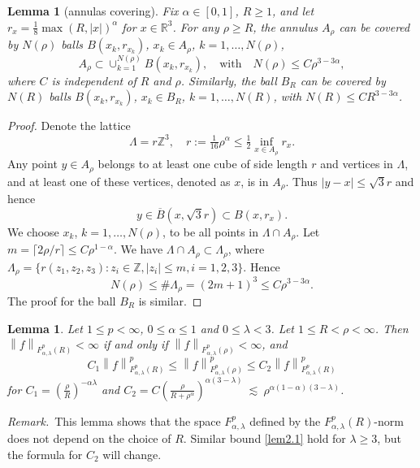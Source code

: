 \documentclass[11pt]{article}
\numberwithin{equation}{section}
\newtheorem{lem}[thm]{Lemma}
\theoremstyle{remark}
\theoremstyle{definition}
\newcommand{\bke}[1]{\left ( #1 \right )}
\newcommand{\norm}[1]{\left \| #1 \right \|}
\newcommand{\R}{\mathbb{R}}
\newcommand\La{\Lambda}
\newcommand{\lec}{{\ \lesssim \ }}
\newcommand\al{\alpha}
\newcommand\la{\lambda}
\newcommand{\ZZ}{\mathbb{Z}}
\newcommand{\EQ}[1]{\begin{equation} #1 \end{equation}}
\begin{document}
\begin{lem}[annulas covering]\label{annulas-covering}
%
Fix $\al \in [0,1]$, $R \ge 1$, and let $r_x = \frac18 \max(R,|x|)^{\al}$ for $x \in \R^3$.  For any $\rho\ge R$, the annulus $A_\rho$ can be covered by $N(\rho)$ balls $B(x_k,r_{x_k})$, $x_k \in A_\rho$, $k=1,\ldots,N(\rho)$,
\[
A_\rho \subset \cup_{k=1}^{N(\rho)}  B(x_k,r_{x_k}),
\quad
\text{with}
\quad
N(\rho) \le C \rho^{3-3\al},
\]
where $C$ is independent of $R$ and $\rho$. Similarly, the ball $B_R$ can be covered by $N(R)$ balls $B(x_k,r_{x_k})$, $x_k \in B_R$, $k=1,\ldots,N(R)$, with $N(R) \le C R^{3-3\al}$.
\end{lem}

\begin{proof} Denote the lattice
\[
\La=r\ZZ^3, \quad r := \tfrac1{16} \rho^{\al}\le \tfrac12 \inf_{x \in A_\rho} r_x.
\]
Any point $y \in A_\rho$ belongs to at least one cube of side length $r$ and vertices in $\La$, and at least one of these vertices, denoted as $x$, is in $A_\rho$. Thus $|y-x| \le  \sqrt 3 r$ and hence
\[
y\in \overline B(x, \sqrt 3 r) \subset B(x,r_x).
\]
We choose $x_k$, $k=1,\ldots,N(\rho)$, to be all points in $\La \cap A_\rho$.
Let $m = \lceil 2\rho/r \rceil \le C\rho^{1-\al}$. We have $\La \cap A_\rho \subset \La_\rho$, where $\La_\rho = \{ r(z_1,z_2,z_3): z_i \in \ZZ, |z_i| \le m, i=1,2,3\}$. Hence
\[
N(\rho) \le \# \La_\rho=(2m+1)^3 \le C \rho^{3-3\al}.
\]
The proof for the ball $B_R$ is similar.
\end{proof}


\begin{lem}\label{vanishing.initial.data}
 Let $1\le p<\infty$, $0 \le \al \le 1$ and $0 \le \la < 3$.
 Let $1\le R < \rho<\infty$. Then $\norm{f}_{F^{p}_{\al,\lambda}(R)}<\infty$ if and only if $\norm{f}_{F^{p}_{\al,\lambda}(\rho)}<\infty$, and
\EQ{\label{lem2.1}
C_1 \norm{f}^p_{F^{p}_{\al,\lambda}(R)} \le \norm{f}^p_{F^{p}_{\al,\lambda}(\rho)}
 \le C_2 \norm{f}^p_{F^{p}_{\al,\lambda}(R)}
}
for $C_1=\bke{\frac \rho R}^{-{\al \la}}$ and $C_2 = C \bke{\frac \rho{R+\rho^\al}}^{\al(3-\la)}\lec \rho ^{\al(1-\al)(3-\la)}$.
\end{lem}

\emph{Remark.}\ This lemma shows that the space $F^{p}_{\al,\lambda}$ defined by the $F^{p}_{\al,\lambda}(R)$-norm does not depend on the choice of $R$.
Similar bound \eqref{lem2.1} hold for $\la\ge3$, but the formula for $C_2$ will change.%
\end{document}
